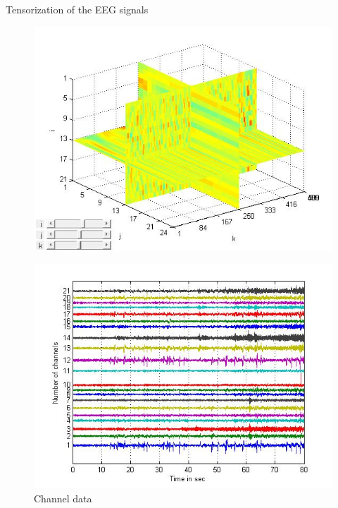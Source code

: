 \documentclass[t,12pt,english
\ifx\beamermode\undefined\else,\beamermode\fi
]{beamer}
\begin{document}
\begin{frame}{Tensorization of the EEG signals}
\begin{figure}[!htbp]
\includegraphics[width=1\textwidth]{17.jpg}
\endminipage\hfill
\end{figure}

\begin{figure}[!htbp]
\centering
\includegraphics[width=.4\textwidth]{14.jpg}\\
\tiny {Channel data}\label{a17}
\end{figure}

\end{frame}
\end{document}
